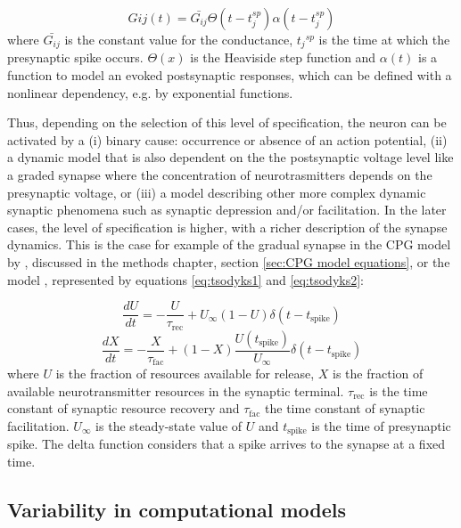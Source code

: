 \begin{equation}
	G{ij}(t) = \bar{G_{ij}}  \Theta(t-t_j^{sp}) \alpha (t-t_j^{sp})
	\label{eq: Gii}
\end{equation}
\noindent where $\bar{G_{ij}}$ is the constant value for the conductance, ${t_j}^{sp}$ is the time at which the presynaptic spike occurs. $\Theta(x)$ is the Heaviside step function and $\alpha(t)$ is a function to model an evoked postsynaptic responses, which can be defined with a nonlinear dependency, e.g. by exponential functions.

Thus, depending on the selection of this level of specification, the neuron can be activated by a (i) binary cause: occurrence or absence of an action potential, (ii) a dynamic model that is also dependent on the the postsynaptic voltage level like a graded synapse where the concentration of neurotrasmitters depends on the presynaptic voltage, or (iii) a model describing  other more complex dynamic synaptic phenomena such as synaptic depression and/or facilitation. In the later cases, the level of specification is higher, with a richer description of the synapse dynamics. This is the case for example of the gradual synapse in the CPG model by \textcite{vavoulis_dynamic_2007}, discussed in the methods chapter, section \ref{sec:CPG model equations}, or the \textcite{tsodyks_neural_1997} model , represented by equations \ref{eq:tsodyks1} and \ref{eq:tsodyks2}:


\begin{equation}
	\frac{dU}{dt} = -\frac{U}{\tau_{\text{rec}}} + U_{\infty}(1 - U) \delta(t - t_{\text{spike}})
	\label{eq:tsodyks1}
\end{equation}
\begin{equation}
	\frac{dX}{dt} = -\frac{X}{\tau_{\text{fac}}} + (1 - X) \frac{U(t_{\text{spike}})}{U_{\infty}} \delta(t - t_{\text{spike}})
	\label{eq:tsodyks2}
\end{equation}
\noindent where $U$ is the fraction of resources available for release, $X$ is the fraction of available neurotransmitter resources in the synaptic terminal. $\tau_\text{rec}$ is the time constant of synaptic resource recovery and $\tau_\text{fac}$ the time constant of synaptic facilitation. $U_\infty$ is the steady-state value of $U$ and $t_{\text{spike}}$ is the time of presynaptic spike. The delta function considers that a spike arrives to the synapse at a fixed time. 


\subsection{Variability in computational models}

